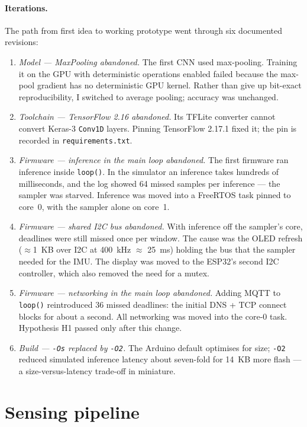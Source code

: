 \documentclass[10pt,a4paper]{article}
\begin{document}
\paragraph{Iterations.} The path from first idea to working prototype went through six documented revisions:
\begin{enumerate}
  \item \emph{Model --- MaxPooling abandoned.} The first CNN used max-pooling. Training it on the GPU with deterministic operations enabled failed because the max-pool gradient has no deterministic GPU kernel. Rather than give up bit-exact reproducibility, I switched to average pooling; accuracy was unchanged.
  \item \emph{Toolchain --- TensorFlow 2.16 abandoned.} Its TFLite converter cannot convert Keras-3 \texttt{Conv1D} layers. Pinning TensorFlow 2.17.1 fixed it; the pin is recorded in \texttt{requirements.txt}.
  \item \emph{Firmware --- inference in the main loop abandoned.} The first firmware ran inference inside \texttt{loop()}. In the simulator an inference takes hundreds of milliseconds, and the log showed 64 missed samples per inference --- the sampler was starved. Inference was moved into a FreeRTOS task pinned to core~0, with the sampler alone on core~1.
  \item \emph{Firmware --- shared I2C bus abandoned.} With inference off the sampler's core, deadlines were still missed once per window. The cause was the OLED refresh ($\approx$\SI{1}{KB} over I2C at \SI{400}{kHz} $\approx$ \SI{25}{ms}) holding the bus that the sampler needed for the IMU. The display was moved to the ESP32's second I2C controller, which also removed the need for a mutex.
  \item \emph{Firmware --- networking in the main loop abandoned.} Adding MQTT to \texttt{loop()} reintroduced 36 missed deadlines: the initial DNS + TCP connect blocks for about a second. All networking was moved into the core-0 task. Hypothesis H1 passed only after this change.
  \item \emph{Build --- \texttt{-Os} replaced by \texttt{-O2}.} The Arduino default optimises for size; \texttt{-O2} reduced simulated inference latency about seven-fold for \SI{14}{KB} more flash --- a size-versus-latency trade-off in miniature.
\end{enumerate}

\section{Sensing pipeline}
\end{document}
